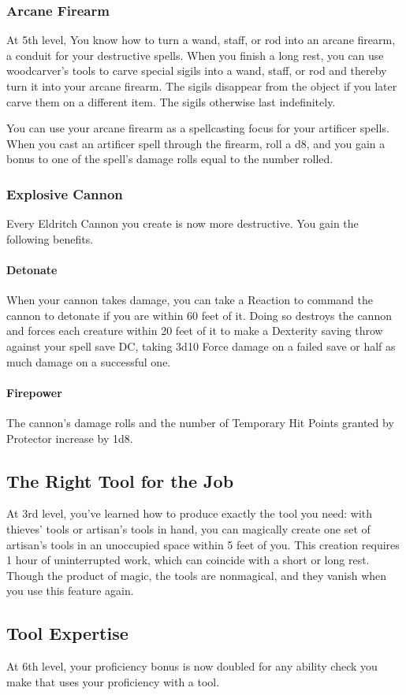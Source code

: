 \documentclass[letterpaper,openany,oneside,twocolumn]{book}
\begin{document}
\subsubsection*{Arcane Firearm}
At 5th level, You know how to turn a wand, staff, or rod into an arcane firearm, a conduit for your destructive spells. When you finish a long rest, you can use woodcarver's tools to carve special sigils into a wand, staff, or rod and thereby turn it into your arcane firearm. The sigils disappear from the object if you later carve them on a different item. The sigils otherwise last indefinitely.

You can use your arcane firearm as a spellcasting focus for your artificer spells. When you cast an artificer spell through the firearm, roll a d8, and you gain a bonus to one of the spell's damage rolls equal to the number rolled.
\subsubsection*{Explosive Cannon}
Every Eldritch Cannon you create is now more destructive. You gain the following benefits.
\paragraph*{Detonate} When your cannon takes damage, you can take a Reaction to command the cannon to detonate if you are within 60 feet of it. Doing so destroys the cannon and forces each creature within 20 feet of it to make a Dexterity saving throw against your spell save DC, taking 3d10 Force damage on a failed save or half as much damage on a successful one.
\paragraph*{Firepower} The cannon's damage rolls and the number of Temporary Hit Points granted by Protector increase by 1d8.
\subsection*{The Right Tool for the Job}
At 3rd level, you've learned how to produce exactly the tool you need: with thieves' tools or artisan's tools in hand, you can magically create one set of artisan's tools in an unoccupied space within 5 feet of you. This creation requires 1 hour of uninterrupted work, which can coincide with a short or long rest. Though the product of magic, the tools are nonmagical, and they vanish when you use this feature again.
\subsection*{Tool Expertise}
At 6th level, your proficiency bonus is now doubled for any ability check you make that uses your proficiency with a tool.
\end{document}
